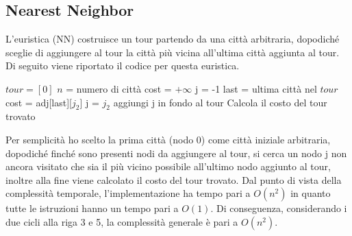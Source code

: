 \documentclass[a4paper,12pt]{report}
\begin{document}
\subsection{Nearest Neighbor}
L'euristica  (NN) costruisce un tour partendo da una città arbitraria, dopodiché sceglie di aggiungere al tour la città più vicina all'ultima città aggiunta al tour. Di seguito viene riportato il codice per questa euristica.
\begin{tcolorbox}[colframe=black, colback=white, boxrule=0.5pt, title=Nearest Neighbor, coltitle=black, fonttitle=\bfseries, colbacktitle=white, breakable]
  \begin{algorithmic}[1]
    \State $tour = [0]$
    \State $n$ = numero di città
        \State cost = $+\infty$
        \State j = -1
          \State last = ultima città nel $tour$
            \State cost = adj[last][$j_2$]
            \State j = $j_2$
          \EndIf
        \EndFor
        \State aggiungi j in fondo al tour
    \EndWhile
    \State Calcola il costo del tour trovato
  \end{algorithmic}
\end{tcolorbox}
Per semplicità ho scelto la prima città (nodo 0) come città iniziale arbitraria, dopodiché finché sono presenti nodi da aggiungere al tour, si cerca un nodo j non ancora visitato che sia il più vicino possibile all'ultimo nodo aggiunto al tour, inoltre alla fine viene calcolato il costo del tour trovato. \newline
Dal punto di vista della complessità temporale, l'implementazione ha tempo pari a $O(n^2)$ in quanto tutte le istruzioni hanno un tempo pari a $O(1)$. Di conseguenza, considerando i due cicli alla riga 3 e 5, la complessità generale è pari a $O(n^2)$.
\end{document}
